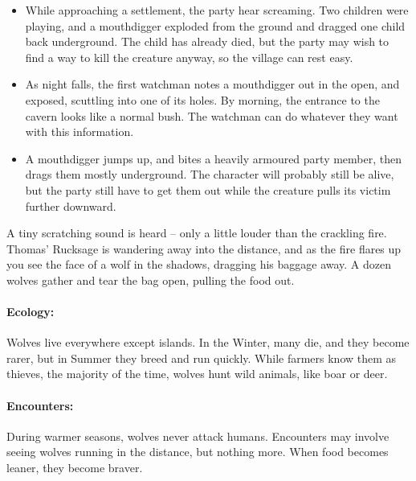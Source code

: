 \begin{multicols}{2}
\begin{itemize}

  \item
  While approaching a settlement, the party hear screaming.
  Two children were playing, and a mouthdigger exploded from the ground and dragged one child back underground.
  The child has already died, but the party may wish to find a way to kill the creature anyway, so the village can rest easy.
  \item
  As night falls, the first watchman notes a mouthdigger out in the open, and exposed, scuttling into one of its holes.
  By morning, the entrance to the cavern looks like a normal bush.
  The watchman can do whatever they want with this information.
  \item
  A mouthdigger jumps up, and bites a heavily armoured party member, then drags them mostly underground.
  The character will probably still be alive, but the party still have to get them out while the creature pulls its victim further downward.

\end{itemize}

\mouthdigger

\label{wolf}

\begin{boxtext}

  A tiny scratching sound is heard -- only a little louder than the crackling fire.
  Thomas' Rucksage is wandering away into the distance, and as the fire flares up you see the face of a wolf in the shadows, dragging his baggage away.
  A dozen wolves gather and tear the bag open, pulling the food out.

\end{boxtext}

\paragraph{Ecology:} Wolves live everywhere except islands.  In the Winter, many die, and they become rarer, but in Summer they breed and run quickly.  While farmers know them as thieves, the majority of the time, wolves hunt wild animals, like boar or deer.


\paragraph{Encounters:} During warmer seasons, wolves never attack humans.
Encounters may involve seeing wolves running in the distance, but nothing more.
When food becomes leaner, they become braver.


\end{multicols}
